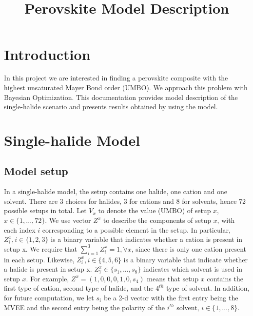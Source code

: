 \documentclass[11pt]{article}
\title{Perovskite Model Description}
\begin{document}
\newcommand{\hwccomment}[1]{{\color{red} (#1)}}
\maketitle
\section{Introduction}
In this project we are interested in finding a perovskite composite with the highest unsaturated Mayer Bond order (UMBO). We approach this problem with Bayesian Optimization. This documentation provides model description of the single-halide scenario and presents results obtained by using the model.
\section{Single-halide Model}
\subsection{Model setup}
In a single-halide model, the setup contains one halide, one cation and one solvent. There are 3 choices for halides, 3 for cations and 8 for solvents, hence 72 possible setups in total. Let $V_x$ to denote the value (UMBO) of setup $x$, $x\in \{1,...,72\}$. We use vector $Z^x$ to describe the components of setup $x$, with each index $i$ corresponding to a possible element in the setup. In particular, $Z^x_i, i\in\{1,2,3\}$ is a binary variable that indicates whether a cation is present in setup x. We require that $\sum_{i=1}^3Z^x_i=1, \forall x$, since there is only one cation present in each setup. Likewise, $Z^x_i, i\in\{4,5,6\}$ is a binary variable that indicate whether a halide is present in setup x. $Z_7^x \in \{s_1,...,s_8\}$ indicates which solvent is used in setup $x$. For example, $Z^x = (1,0,0,0,1,0,s_{4})$ means that setup $x$ contains the first type of cation, second type of halide, and the $4^{th}$ type of solvent. In addition, for future computation, we let $s_i$ be a 2-d vector with the first entry being the MVEE and the second entry being the polarity of the $i^{th}$ solvent, $i\in\{1,...,8\}$. 
\end{document}
